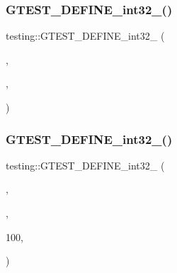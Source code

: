 \mbox{\label{namespacetesting_aae6f1140f03d7bf24067df0f6628e9ea}} 
\subsubsection{\texorpdfstring{GTEST\_DEFINE\_int32\_()}{GTEST\_DEFINE\_int32\_()}\hspace{0.1cm}{\footnotesize\ttfamily [2/3]}}
{\footnotesize\ttfamily testing\+::\+G\+T\+E\+S\+T\+\_\+\+D\+E\+F\+I\+N\+E\+\_\+int32\+\_\+ (\begin{DoxyParamCaption}\item[{repeat}]{,  }\item[{\mbox{\hyperlink{namespacetesting_1_1internal_a0f7e728793f9e6cb0aa2b69eaa468bf3}{internal\+::\+Int32\+From\+G\+Test\+Env}}(\char`\"{}repeat\char`\"{}, 1)}]{,  }\item[{\char`\"{}How many times to repeat each test. Specify a negative number \char`\"{} \char`\"{}for repeating forever. Useful for shaking out flaky tests.\char`\"{}}]{ }\end{DoxyParamCaption})}

\mbox{\label{namespacetesting_a84af642630c9181f00fcf0a4a63e795e}} 
\subsubsection{\texorpdfstring{GTEST\_DEFINE\_int32\_()}{GTEST\_DEFINE\_int32\_()}\hspace{0.1cm}{\footnotesize\ttfamily [3/3]}}
{\footnotesize\ttfamily testing\+::\+G\+T\+E\+S\+T\+\_\+\+D\+E\+F\+I\+N\+E\+\_\+int32\+\_\+ (\begin{DoxyParamCaption}\item[{stack\+\_\+trace\+\_\+depth}]{,  }\item[{\mbox{\hyperlink{namespacetesting_1_1internal_a0f7e728793f9e6cb0aa2b69eaa468bf3}{internal\+::\+Int32\+From\+G\+Test\+Env}}(\char`\"{}stack\+\_\+trace\+\_\+depth\char`\"{}, k\+Max\+Stack\+Trace\+Depth)}]{,  }\item[{\char`\"{}The maximum number of stack frames to \mbox{\hyperlink{_output_8h_a44e8f67d499345dd94e7d05b8d2e71b9}{print}} when an \char`\"{} \char`\"{}assertion fails. The valid range is 0 through}]{100,  }\item[{inclusive.\char`\"{}}]{ }\end{DoxyParamCaption})}

